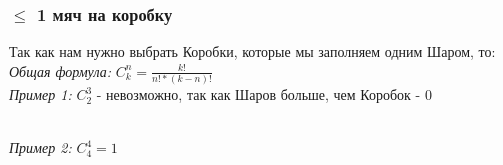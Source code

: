 \documentclass{article}
\begin{document}
            \subsubsection{$\le$ 1 мяч на коробку}
                Так как нам нужно выбрать Коробки, которые мы заполняем одним Шаром, то:\\
                \textit{Общая формула:} $ C^n_k = \frac{k!}{n!*(k-n)!} $\\
                \textit{Пример 1:} $ C^3_2 $ - невозможно, так как Шаров больше, чем Коробок - 0
                \begin{figure}[h!]
                \end{figure}\\
                \textit{Пример 2:} $ C^4_4 = 1 $
                \begin{figure}[h!]
                \end{figure}
\end{document}
